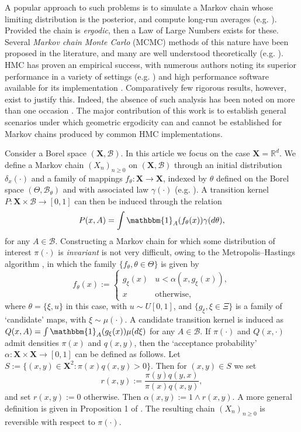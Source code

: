 \documentclass[bj,numbers,noshowframe]{imsart}
\newcommand{\X}{\mathbf{X}}
\newcommand{\R}{\mathbb{R}}
\newcommand{\B}{\mathcal{B}}
\theoremstyle{definition}
\theoremstyle{plain}
\theoremstyle{definition}
\begin{document}
A popular approach to such problems is to simulate a Markov chain whose limiting distribution is the posterior, and compute long-run averages (e.g. \citep{roberts2004general}).  Provided the chain is \emph{ergodic}, then a Law of Large Numbers exists for these.  Several \emph{Markov chain Monte Carlo} (MCMC) methods of this nature have been proposed in the literature, and many are well understood theoretically (e.g. \citep{roberts1996geometric,roberts1996exponential}).  HMC has proven an empirical success, with numerous authors noting its superior performance in a variety of settings (e.g. \citep{gelman2014bayesian}) and high performance software available for its implementation \citep{carpenter2016stan}. Comparatively few rigorous results, however, exist to justify this.  Indeed, the absence of such analysis has been noted on more than one occasion \citep{diaconis2013some,diaconis2014connections}.  The major contribution of this work is to establish general scenarios under which geometric ergodicity can and cannot be established for Markov chains produced by common HMC implementations.

Consider a Borel space $(\X,\B)$.  In this article we focus on the case $\X = \R^d$.  We define a Markov chain $(X_n)_{n \geq 0}$ on $(\X,\B)$ through an initial distribution $\delta_{x}(\cdot)$ and a family of mappings $f_\theta:\X \to \X$, indexed by $\theta$ defined on the Borel space $(\Theta,\B_{\theta})$ and with associated law $\gamma(\cdot)$ (e.g. \citep{diaconis1999iterated}).  A transition kernel $P: \X \times \B \to [0,1]$ can then be induced through the relation
\begin{equation*}
P(x,A) = \int \mathbbm{1}_A(f_\theta(x))\gamma(d\theta),
\end{equation*}
for any $A \in \B$.  Constructing a Markov chain for which some distribution of interest $\pi(\cdot)$ is \emph{invariant} is not very difficult, owing to the Metropolis--Hastings algorithm \citep{metropolis1953equation, hastings1970monte}, in which the family $\{f_\theta, \theta \in \Theta\}$ is given by
\[
f_\theta(x) := \begin{cases}
g_\xi(x) & u < \alpha(x,g_\xi(x)), \\
x & \text{otherwise},
\end{cases}
\]
where $\theta = \{\xi,u\}$ in this case, with $u \sim U[0,1]$, and $\{g_\xi, \xi \in \Xi\}$ is a family of `candidate' maps, with $\xi \sim \mu(\cdot)$.  A candidate transition kernel is induced as $Q(x,A) = \int \mathbbm{1}_A(g_\xi(x))\mu(d\xi)$ for any $A \in \B$.  If $\pi(\cdot)$ and $Q(x,\cdot)$ admit densities $\pi(x)$ and $q(x,y)$, then the `acceptance probability' $\alpha: \X \times \X \to [0,1]$ can be defined as follows.  Let $S := \{(x,y) \in \mathbf{X}^2 : \pi(x)q(x,y) >0 \}$. Then for $(x,y) \in S$ we set 
\begin{equation} \label{eqn:accept}
r(x,y) := \frac{\pi(y)q(y,x)}{\pi(x)q(x,y)},
\end{equation}
and set $r(x,y) := 0$ otherwise.  Then $\alpha(x,y) := 1 \wedge r(x,y)$.  A more general definition is given in Proposition 1 of \citep{tierney1998note}.  The resulting chain $(X_n)_{n \geq 0}$ is reversible with respect to $\pi(\cdot)$.
\end{document}
